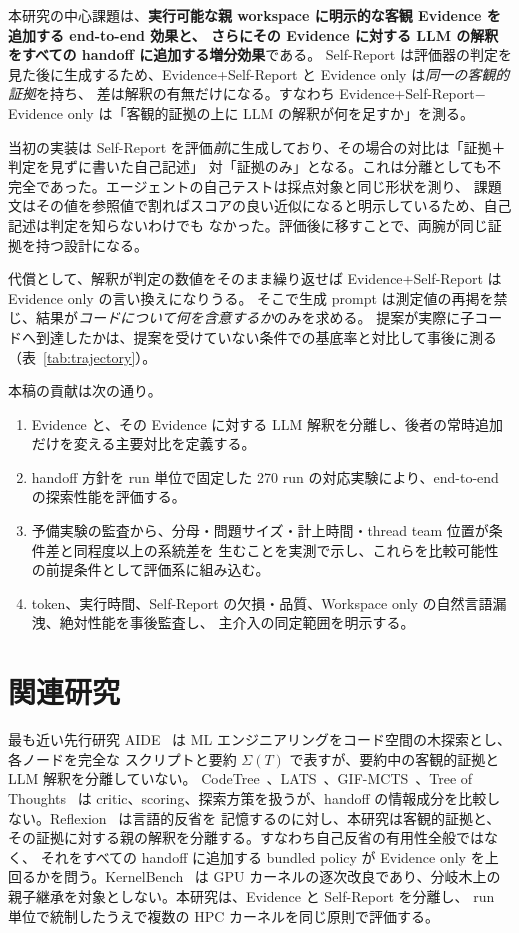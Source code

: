 \documentclass[conference,letterpaper]{IEEEtran}
\newcommand{\armW}{Workspace only}
\newcommand{\armE}{Evidence only}
\newcommand{\armS}{Evidence+Self-Report}
\begin{document}
本研究の中心課題は、\textbf{実行可能な親 workspace に明示的な客観 Evidence を追加する end-to-end 効果と、
さらにその Evidence に対する LLM の解釈をすべての handoff に追加する増分効果}である。
Self-Report は評価器の判定を見た後に生成するため、\armS{} と \armE{} は\emph{同一の客観的証拠}を持ち、
差は解釈の有無だけになる。すなわち \armS{}$-$\armE{} は「客観的証拠の上に LLM の解釈が何を足すか」を測る。

当初の実装は Self-Report を評価\emph{前}に生成しており、その場合の対比は「証拠＋判定を見ずに書いた自己記述」
対「証拠のみ」となる。これは分離としても不完全であった。エージェントの自己テストは採点対象と同じ形状を測り、
課題文はその値を参照値で割ればスコアの良い近似になると明示しているため、自己記述は判定を知らないわけでも
なかった。評価後に移すことで、両腕が同じ証拠を持つ設計になる。

代償として、解釈が判定の数値をそのまま繰り返せば \armS{} は \armE{} の言い換えになりうる。
そこで生成 prompt は測定値の再掲を禁じ、結果が\emph{コードについて何を含意するか}のみを求める。
提案が実際に子コードへ到達したかは、提案を受けていない条件での基底率と対比して事後に測る
（表~\ref{tab:trajectory}）。

本稿の貢献は次の通り。
\begin{enumerate}
  \item Evidence と、その Evidence に対する LLM 解釈を分離し、後者の常時追加だけを変える主要対比を定義する。
  \item handoff 方針を run 単位で固定した 270 run の対応実験により、end-to-end の探索性能を評価する。
  \item 予備実験の監査から、分母・問題サイズ・計上時間・thread team 位置が条件差と同程度以上の系統差を
    生むことを実測で示し、これらを比較可能性の前提条件として評価系に組み込む。
  \item token、実行時間、Self-Report の欠損・品質、\armW{} の自然言語漏洩、絶対性能を事後監査し、
    主介入の同定範囲を明示する。
\end{enumerate}

\section{関連研究}
最も近い先行研究 AIDE~\cite{aide} は ML エンジニアリングをコード空間の木探索とし、各ノードを完全な
スクリプトと要約 $\Sigma(T)$ で表すが、要約中の客観的証拠と LLM 解釈を分離していない。
CodeTree~\cite{codetree}、LATS~\cite{lats}、GIF-MCTS~\cite{gifmcts}、Tree of Thoughts~\cite{tot} は
critic、scoring、探索方策を扱うが、handoff の情報成分を比較しない。Reflexion~\cite{reflexion} は言語的反省を
記憶するのに対し、本研究は客観的証拠と、その証拠に対する親の解釈を分離する。すなわち自己反省の有用性全般ではなく、
それをすべての handoff に追加する bundled policy が \armE{} を上回るかを問う。KernelBench~\cite{kernelbench} は
GPU カーネルの逐次改良であり、分岐木上の親子継承を対象としない。本研究は、Evidence と Self-Report を分離し、
run 単位で統制したうえで複数の HPC カーネルを同じ原則で評価する。
\end{document}
